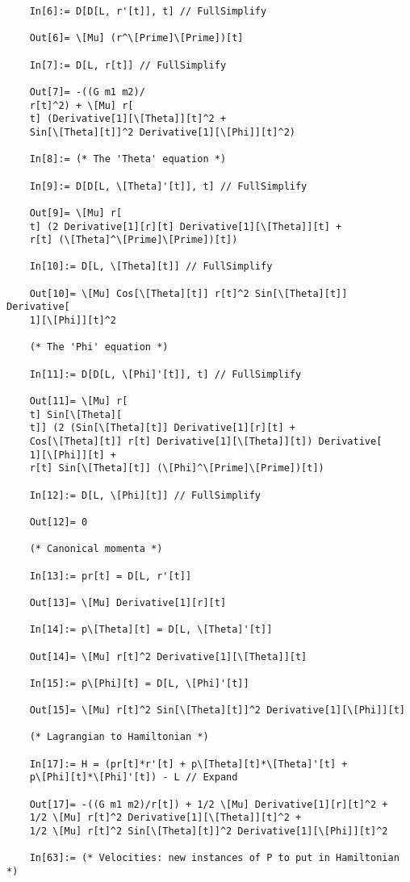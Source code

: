 \documentclass{article}
\theoremstyle{definition}
\begin{document}
\begin{enumerate}[label=(\alph*)]
\begin{lstlisting}
	In[6]:= D[D[L, r'[t]], t] // FullSimplify
	
	Out[6]= \[Mu] (r^\[Prime]\[Prime])[t]
	
	In[7]:= D[L, r[t]] // FullSimplify
	
	Out[7]= -((G m1 m2)/
	r[t]^2) + \[Mu] r[
	t] (Derivative[1][\[Theta]][t]^2 + 
	Sin[\[Theta][t]]^2 Derivative[1][\[Phi]][t]^2)
	
	In[8]:= (* The 'Theta' equation *)
	
	In[9]:= D[D[L, \[Theta]'[t]], t] // FullSimplify
	
	Out[9]= \[Mu] r[
	t] (2 Derivative[1][r][t] Derivative[1][\[Theta]][t] + 
	r[t] (\[Theta]^\[Prime]\[Prime])[t])
	
	In[10]:= D[L, \[Theta][t]] // FullSimplify
	
	Out[10]= \[Mu] Cos[\[Theta][t]] r[t]^2 Sin[\[Theta][t]] Derivative[
	1][\[Phi]][t]^2
	
	(* The 'Phi' equation *)
	
	In[11]:= D[D[L, \[Phi]'[t]], t] // FullSimplify
	
	Out[11]= \[Mu] r[
	t] Sin[\[Theta][
	t]] (2 (Sin[\[Theta][t]] Derivative[1][r][t] + 
	Cos[\[Theta][t]] r[t] Derivative[1][\[Theta]][t]) Derivative[
	1][\[Phi]][t] + 
	r[t] Sin[\[Theta][t]] (\[Phi]^\[Prime]\[Prime])[t])
	
	In[12]:= D[L, \[Phi][t]] // FullSimplify
	
	Out[12]= 0
	
	(* Canonical momenta *)
	
	In[13]:= pr[t] = D[L, r'[t]]
	
	Out[13]= \[Mu] Derivative[1][r][t]
	
	In[14]:= p\[Theta][t] = D[L, \[Theta]'[t]]
	
	Out[14]= \[Mu] r[t]^2 Derivative[1][\[Theta]][t]
	
	In[15]:= p\[Phi][t] = D[L, \[Phi]'[t]]
	
	Out[15]= \[Mu] r[t]^2 Sin[\[Theta][t]]^2 Derivative[1][\[Phi]][t]
	
	(* Lagrangian to Hamiltonian *)
	
	In[17]:= H = (pr[t]*r'[t] + p\[Theta][t]*\[Theta]'[t] + 
	p\[Phi][t]*\[Phi]'[t]) - L // Expand
	
	Out[17]= -((G m1 m2)/r[t]) + 1/2 \[Mu] Derivative[1][r][t]^2 + 
	1/2 \[Mu] r[t]^2 Derivative[1][\[Theta]][t]^2 + 
	1/2 \[Mu] r[t]^2 Sin[\[Theta][t]]^2 Derivative[1][\[Phi]][t]^2
	
	In[63]:= (* Velocities: new instances of P to put in Hamiltonian *)
	

\end{lstlisting}
\end{enumerate}
\end{document}
